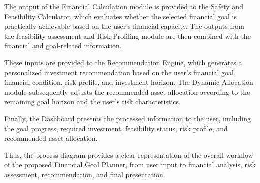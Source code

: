 The output of the Financial Calculation module is provided to the
Safety and Feasibility Calculator, which evaluates whether the
selected financial goal is practically achievable based on the
user's financial capacity. The outputs from the feasibility
assessment and Risk Profiling module are then combined with the
financial and goal-related information.

These inputs are provided to the Recommendation Engine, which
generates a personalized investment recommendation based on the
user's financial goal, financial condition, risk profile, and
investment horizon. The Dynamic Allocation module subsequently
adjusts the recommended asset allocation according to the remaining
goal horizon and the user's risk characteristics.

Finally, the Dashboard presents the processed information to the
user, including the goal progress, required investment, feasibility
status, risk profile, and recommended asset allocation.

Thus, the process diagram provides a clear representation of the
overall workflow of the proposed Financial Goal Planner, from user
input to financial analysis, risk assessment, recommendation, and
final presentation.

